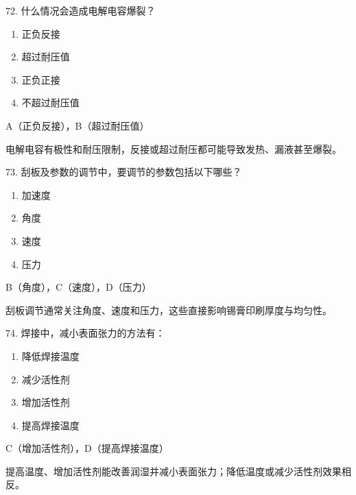 \begin{question}{72. 什么情况会造成电解电容爆裂？}
\begin{enumerate}[label=\Alph*., leftmargin=2.4em, itemsep=0.2em]
\item 正负反接
\item 超过耐压值
\item 正负正接
\item 不超过耐压值
\end{enumerate}
\end{question}
\begin{answer}
A（正负反接），B（超过耐压值）
\end{answer}
\begin{explanation}
电解电容有极性和耐压限制，反接或超过耐压都可能导致发热、漏液甚至爆裂。
\end{explanation}

\begin{question}{73. 刮板及参数的调节中，要调节的参数包括以下哪些？}
\begin{enumerate}[label=\Alph*., leftmargin=2.4em, itemsep=0.2em]
\item 加速度
\item 角度
\item 速度
\item 压力
\end{enumerate}
\end{question}
\begin{answer}
B（角度），C（速度），D（压力）
\end{answer}
\begin{explanation}
刮板调节通常关注角度、速度和压力，这些直接影响锡膏印刷厚度与均匀性。
\end{explanation}

\begin{question}{74. 焊接中，减小表面张力的方法有：}
\begin{enumerate}[label=\Alph*., leftmargin=2.4em, itemsep=0.2em]
\item 降低焊接温度
\item 减少活性剂
\item 增加活性剂
\item 提高焊接温度
\end{enumerate}
\end{question}
\begin{answer}
C（增加活性剂），D（提高焊接温度）
\end{answer}
\begin{explanation}
提高温度、增加活性剂能改善润湿并减小表面张力；降低温度或减少活性剂效果相反。
\end{explanation}

